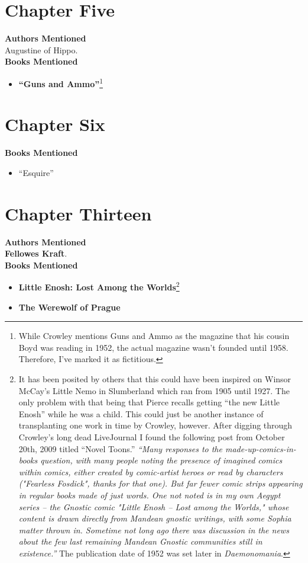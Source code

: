 \documentclass[12pt,makeidx]{extreport}
\begin{document}
\section{Chapter Five}
\textbf{Authors Mentioned}\\
Augustine of Hippo.
\\

\hspace{-1.5em}\textbf{Books Mentioned}
\begin{itemize}
\item \textbf{“Guns and Ammo”}\footnote{While Crowley mentions Guns and Ammo as the magazine that his cousin Boyd was reading in 1952, the actual magazine wasn’t founded until 1958. Therefore, I’ve marked it as fictitious.} \cite{gunsnammo}
\end{itemize}

\section{Chapter Six}
\textbf{Books Mentioned}
\begin{itemize}
\item “Esquire” \cite{esquire}
\end{itemize}

\section{Chapter Thirteen}
\textbf{Authors Mentioned}\\
\textbf{Fellowes Kraft}.
\\

\hspace{-1.5em}\textbf{Books Mentioned}
\begin{itemize}
\item \textbf{Little Enosh: Lost Among the Worlds}\footnote{It has been posited by others that this could have been inspired on Winsor McCay’s Little Nemo in Slumberland which ran from 1905 until 1927. The only problem with that being that Pierce recalls getting “the new Little Enosh” while he was a child. This could just be another instance of transplanting one work in time by Crowley, however. After digging through Crowley's long dead LiveJournal I found the following post from October 20th, 2009 titled ``Novel Toons.'' \textit{``Many responses to the made-up-comics-in-books question, with many people noting the presence of imagined comics within comics, either created by comic-artist heroes or read by characters ("Fearless Fosdick", thanks for that one).  But far fewer comic strips appearing in regular books made of just words.  One not noted is in my own Aegypt series -- the Gnostic comic "Little Enosh -- Lost among the Worlds," whose content is drawn directly from Mandean gnostic writings, with some Sophia matter thrown in.  Sometime not long ago there was discussion in the news about the few last remaining Mandean Gnostic communities still in existence.''} The publication date of 1952 was set later in \textit{Daemonomania}.\label{enosh}} \cite{enosh}
\item \textbf{The Werewolf of Prague} \cite{CraftW1}
\end{itemize}
\end{document}
